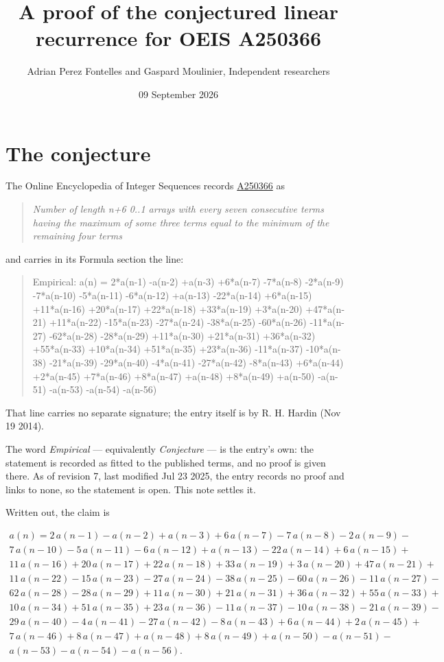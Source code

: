 \documentclass[11pt]{article}
\title{A proof of the conjectured linear recurrence for OEIS A250366}
\author{Adrian Perez Fontelles and Gaspard Moulinier, Independent researchers}
\date{09 September 2026}
\theoremstyle{definition}
\begin{document}
\maketitle
\section{The conjecture}

The Online Encyclopedia of Integer Sequences records \href{https://oeis.org/A250366}{A250366} as

\begin{quote}\itshape Number of length n+6 0..1 arrays with every seven consecutive terms having the maximum of some three terms equal to the minimum of the remaining four terms\end{quote}

and carries in its Formula section the line:

\begin{quote}\ttfamily Empirical: a(n) = 2*a(n-1) -a(n-2) +a(n-3) +6*a(n-7) -7*a(n-8) -2*a(n-9) -7*a(n-10) -5*a(n-11) -6*a(n-12) +a(n-13) -22*a(n-14) +6*a(n-15) +11*a(n-16) +20*a(n-17) +22*a(n-18) +33*a(n-19) +3*a(n-20) +47*a(n-21) +11*a(n-22) -15*a(n-23) -27*a(n-24) -38*a(n-25) -60*a(n-26) -11*a(n-27) -62*a(n-28) -28*a(n-29) +11*a(n-30) +21*a(n-31) +36*a(n-32) +55*a(n-33) +10*a(n-34) +51*a(n-35) +23*a(n-36) -11*a(n-37) -10*a(n-38) -21*a(n-39) -29*a(n-40) -4*a(n-41) -27*a(n-42) -8*a(n-43) +6*a(n-44) +2*a(n-45) +7*a(n-46) +8*a(n-47) +a(n-48) +8*a(n-49) +a(n-50) -a(n-51) -a(n-53) -a(n-54) -a(n-56)\end{quote}

That line carries no separate signature; the entry itself is by R. H. Hardin (Nov 19 2014).

The word {\itshape Empirical} --- equivalently {\itshape Conjecture} --- is the entry's own: the statement is recorded as fitted to the published terms, and no proof is given there. As of revision 7, last modified Jul 23 2025, the entry records no proof and links to none, so the statement is open. This note settles it.

Written out, the claim is

\begin{multline*} a(n) = 2\,a(n-1) - a(n-2) + a(n-3) + 6\,a(n-7) - 7\,a(n-8) - 2\,a(n-9) - \\ 7\,a(n-10) - 5\,a(n-11) - 6\,a(n-12) + a(n-13) - 22\,a(n-14) + 6\,a(n-15) + \\ 11\,a(n-16) + 20\,a(n-17) + 22\,a(n-18) + 33\,a(n-19) + 3\,a(n-20) + 47\,a(n-21) + \\ 11\,a(n-22) - 15\,a(n-23) - 27\,a(n-24) - 38\,a(n-25) - 60\,a(n-26) - 11\,a(n-27) - \\ 62\,a(n-28) - 28\,a(n-29) + 11\,a(n-30) + 21\,a(n-31) + 36\,a(n-32) + 55\,a(n-33) + \\ 10\,a(n-34) + 51\,a(n-35) + 23\,a(n-36) - 11\,a(n-37) - 10\,a(n-38) - 21\,a(n-39) - \\ 29\,a(n-40) - 4\,a(n-41) - 27\,a(n-42) - 8\,a(n-43) + 6\,a(n-44) + 2\,a(n-45) + \\ 7\,a(n-46) + 8\,a(n-47) + a(n-48) + 8\,a(n-49) + a(n-50) - a(n-51) - \\ a(n-53) - a(n-54) - a(n-56). \end{multline*}
\end{document}
